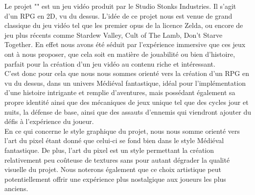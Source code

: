 Le projet "\gameName" est un jeu vidéo produit par le Studio Stonks Industries. 
Il s’agit d’un RPG en 2D, vu du dessus. 
L’idée de ce projet nous est venue de grand classique du jeu vidéo tel que les premier opus de la licence Zelda, ou encore de jeu plus récents comme Stardew Valley, Cult of The Lamb, Don’t Starve Together. 
En effet nous avons été séduit par l'expérience immersive que ces jeux ont à nous proposer, que cela soit en matière de jouabilité ou bien d’histoire, parfait pour la création d’un jeu vidéo au contenu riche et intéressant. 
\\

C’est donc pour cela que nous nous sommes orienté vers la création d’un RPG en vu du dessus, dans un univers Médiéval fantastique, idéal pour l’implémentation d’une histoire intrigante et remplie d’aventures, mais possédant également sa propre identité ainsi que des mécaniques de jeux unique tel que des cycles jour et nuits, la défense de base, ainsi que des assauts d’ennemis qui viendront ajouter du défis à l'expérience du joueur.
\\

En ce qui concerne le style graphique du projet, nous nous somme orienté vers l’art du pixel étant donné que celui-ci se fond bien dans le style Médiéval fantastique. 
De plus, l’art du pixel est un style permettant la création relativement peu coûteuse de textures sans pour autant dégrader la qualité visuelle du projet. 
Nous noterons également que ce choix artistique peut potentiellement offrir une expérience plus nostalgique aux joueurs les plus anciens.
